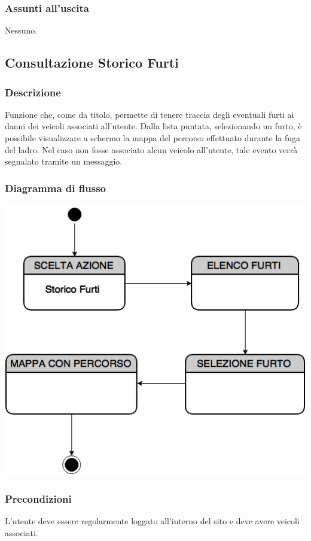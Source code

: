 \documentclass[a4paper,12pt]{article}
\begin{document}
\subsubsection{Assunti all'uscita}
Nessuno.

\pagebreak

\subsection{Consultazione Storico Furti}
\subsubsection{Descrizione}
Funzione che, come da titolo, permette di tenere traccia degli eventuali furti ai danni dei veicoli associati all'utente. Dalla lista puntata, selezionando un furto, è possibile visualizzare a schermo la mappa del percorso effettuato durante la fuga del ladro. Nel caso non fosse associato alcun veicolo all'utente, tale evento verrà segnalato tramite un messaggio.
\subsubsection{Diagramma di flusso}

\begin{center}
\includegraphics[scale=0.5]{Storico.png}
\end{center}
\subsubsection{Precondizioni}
L'utente deve essere regolarmente loggato all'interno del sito e deve avere veicoli associati.
\end{document}
